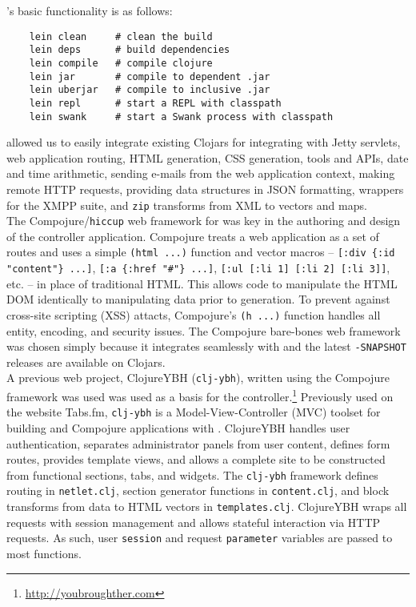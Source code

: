 \lein's basic functionality is as follows:
\begin{verbatim}
    lein clean     # clean the build
    lein deps      # build dependencies
    lein compile   # compile clojure
    lein jar       # compile to dependent .jar
    lein uberjar   # compile to inclusive .jar
    lein repl      # start a REPL with classpath
    lein swank     # start a Swank process with classpath
\end{verbatim}

\lein allowed us to easily integrate existing Clojars for integrating with Jetty servlets, web application routing, HTML generation, CSS generation, \aengn tools and APIs, date and time arithmetic, sending e-mails from the web application context, making remote HTTP requests, providing \clojure data structures in JSON formatting, wrappers for the \jsmack XMPP suite, and \texttt{zip} transforms from XML to \clojure vectors and maps.\\

The Compojure/\texttt{hiccup} web framework for \clojure was key in the authoring and design of the \netlets controller application.  Compojure treats a web application as a set of routes and uses a simple \texttt{(html ...)} function and vector macros -- \texttt{[:div \{:id "content"\} ...]}, \texttt{[:a \{:href "\#"\} ...]}, \texttt{[:ul [:li 1] [:li 2] [:li 3]]}, etc. --  in place of traditional HTML. This allows \clojure code to  manipulate the HTML DOM identically to manipulating \clojure data prior to generation.   To prevent against \js cross-site scripting (XSS) attacts, Compojure's \texttt{(h ...)} function handles all entity, encoding, and security issues.  The Compojure bare-bones web framework was chosen simply because it integrates seamlessly with \lein and the latest \texttt{-SNAPSHOT} releases are available on Clojars.\\

 A previous \clojure web project, ClojureYBH (\texttt{clj-ybh}), written using the Compojure framework was used was used as a basis for the \netlets controller.\footnote{\url{http://youbroughther.com}}  Previously used on the website Tabs.fm, \texttt{clj-ybh} is a Model-View-Controller (MVC) toolset for building \gae and Compojure applications with \clojure. ClojureYBH handles user authentication, separates administrator panels from user content, defines form routes, provides template views, and allows a complete site to be constructed from functional sections, tabs, and widgets.  The \texttt{clj-ybh} framework defines routing in \texttt{netlet.clj}, section generator functions in \texttt{content.clj}, and block transforms from data to HTML vectors in \texttt{templates.clj}.  ClojureYBH wraps all requests with session management and allows stateful interaction via HTTP requests.  As such, user \texttt{session} and request \texttt{parameter} variables are passed to most functions.\\

